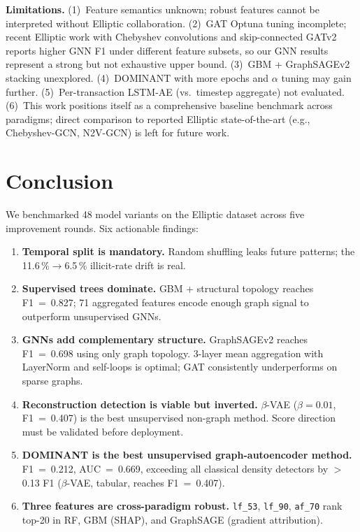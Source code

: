 \documentclass[conference]{IEEEtran}
\begin{document}
\textbf{Limitations.}
(1)~Feature semantics unknown; robust features cannot be interpreted without
Elliptic collaboration.
(2)~GAT Optuna tuning incomplete; recent Elliptic work with Chebyshev
convolutions and skip-connected GATv2 reports higher GNN F1 under
different feature subsets, so our GNN results represent a strong but not
exhaustive upper bound.
(3)~GBM + GraphSAGEv2 stacking unexplored.
(4)~DOMINANT with more epochs and $\alpha$ tuning may gain further.
(5)~Per-transaction LSTM-AE (vs.\ timestep aggregate) not evaluated.
(6)~This work positions itself as a comprehensive baseline benchmark
across paradigms; direct comparison to reported Elliptic state-of-the-art
(e.g., Chebyshev-GCN, N2V-GCN) is left for future work.

\section{Conclusion}

We benchmarked 48 model variants on the Elliptic dataset across five
improvement rounds.  Six actionable findings:

\begin{enumerate}
  \item \textbf{Temporal split is mandatory.}  Random shuffling leaks future
        patterns; the 11.6\,\%$\to$6.5\,\% illicit-rate drift is real.
  \item \textbf{Supervised trees dominate.}  GBM + structural topology
        reaches F1~=~0.827; 71 aggregated features encode enough graph
        signal to outperform unsupervised GNNs.
  \item \textbf{GNNs add complementary structure.}  GraphSAGEv2 reaches
        F1~=~0.698 using only graph topology.  3-layer mean aggregation
        with LayerNorm and self-loops is optimal; GAT consistently
        underperforms on sparse graphs.
  \item \textbf{Reconstruction detection is viable but inverted.}
        $\beta$-VAE ($\beta{=}0.01$, F1~=~0.407) is the best unsupervised
        non-graph method.  Score direction must be validated before deployment.
  \item \textbf{DOMINANT is the best unsupervised graph-autoencoder method.}
        F1~=~0.212, AUC~=~0.669, exceeding all classical density detectors
        by $>$0.13 F1 ($\beta$-VAE, tabular, reaches F1~=~0.407).
  \item \textbf{Three features are cross-paradigm robust.}
        \texttt{lf\_53}, \texttt{lf\_90}, \texttt{af\_70} rank top-20 in
        RF, GBM (SHAP), and GraphSAGE (gradient attribution).
\end{enumerate}
\end{document}
